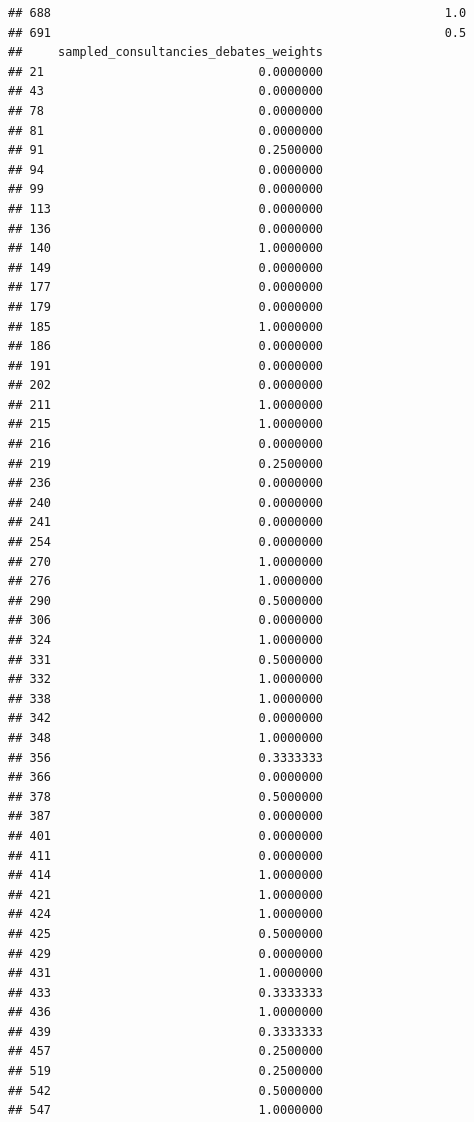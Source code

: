 \documentclass[
]{article}
\begin{document}
\begin{verbatim}
## 688                                                       1.0
## 691                                                       0.5
##     sampled_consultancies_debates_weights
## 21                              0.0000000
## 43                              0.0000000
## 78                              0.0000000
## 81                              0.0000000
## 91                              0.2500000
## 94                              0.0000000
## 99                              0.0000000
## 113                             0.0000000
## 136                             0.0000000
## 140                             1.0000000
## 149                             0.0000000
## 177                             0.0000000
## 179                             0.0000000
## 185                             1.0000000
## 186                             0.0000000
## 191                             0.0000000
## 202                             0.0000000
## 211                             1.0000000
## 215                             1.0000000
## 216                             0.0000000
## 219                             0.2500000
## 236                             0.0000000
## 240                             0.0000000
## 241                             0.0000000
## 254                             0.0000000
## 270                             1.0000000
## 276                             1.0000000
## 290                             0.5000000
## 306                             0.0000000
## 324                             1.0000000
## 331                             0.5000000
## 332                             1.0000000
## 338                             1.0000000
## 342                             0.0000000
## 348                             1.0000000
## 356                             0.3333333
## 366                             0.0000000
## 378                             0.5000000
## 387                             0.0000000
## 401                             0.0000000
## 411                             0.0000000
## 414                             1.0000000
## 421                             1.0000000
## 424                             1.0000000
## 425                             0.5000000
## 429                             0.0000000
## 431                             1.0000000
## 433                             0.3333333
## 436                             1.0000000
## 439                             0.3333333
## 457                             0.2500000
## 519                             0.2500000
## 542                             0.5000000
## 547                             1.0000000

\end{verbatim}
\end{document}
